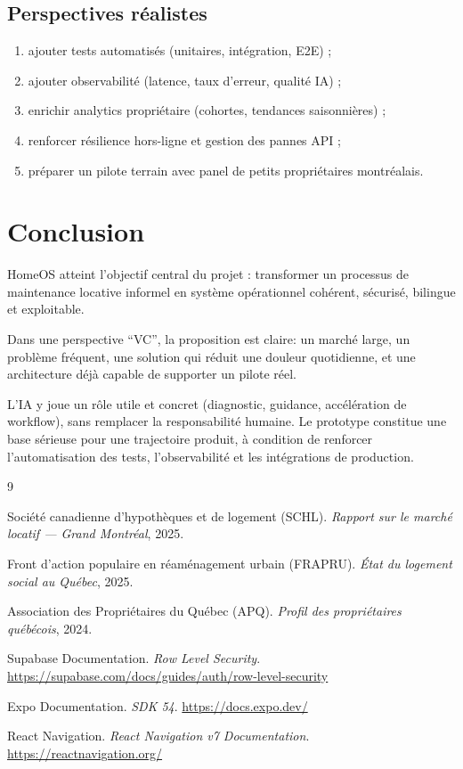 \documentclass[11pt,a4paper]{article}
\begin{document}
\subsection{Perspectives réalistes}

\begin{enumerate}[leftmargin=1.4em]
  \item ajouter tests automatisés (unitaires, intégration, E2E) ;
  \item ajouter observabilité (latence, taux d'erreur, qualité IA) ;
  \item enrichir analytics propriétaire (cohortes, tendances saisonnières) ;
  \item renforcer résilience hors-ligne et gestion des pannes API ;
  \item préparer un pilote terrain avec panel de petits propriétaires montréalais.
\end{enumerate}

\section{Conclusion}

HomeOS atteint l'objectif central du projet : transformer un processus de maintenance locative informel en système opérationnel cohérent, sécurisé, bilingue et exploitable.

Dans une perspective ``VC'', la proposition est claire: un marché large, un problème fréquent, une solution qui réduit une douleur quotidienne, et une architecture déjà capable de supporter un pilote réel.

L'IA y joue un rôle utile et concret (diagnostic, guidance, accélération de workflow), sans remplacer la responsabilité humaine. Le prototype constitue une base sérieuse pour une trajectoire produit, à condition de renforcer l'automatisation des tests, l'observabilité et les intégrations de production.

\newpage
{}
\begin{thebibliography}{9}

Société canadienne d'hypothèques et de logement (SCHL). \textit{Rapport sur le marché locatif — Grand Montréal}, 2025.

Front d'action populaire en réaménagement urbain (FRAPRU). \textit{État du logement social au Québec}, 2025.

Association des Propriétaires du Québec (APQ). \textit{Profil des propriétaires québécois}, 2024.

Supabase Documentation. \textit{Row Level Security}. \url{https://supabase.com/docs/guides/auth/row-level-security}

Expo Documentation. \textit{SDK 54}. \url{https://docs.expo.dev/}

React Navigation. \textit{React Navigation v7 Documentation}. \url{https://reactnavigation.org/}

\end{thebibliography}
\end{document}
